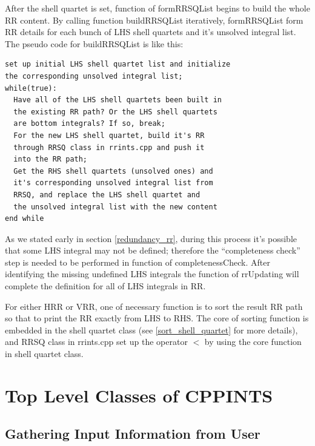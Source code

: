 After the shell quartet is set, function of formRRSQList begins to build 
the whole RR content. By calling function buildRRSQList iteratively, 
formRRSQList form RR details for each bunch of LHS shell quartets and it's 
unsolved integral list. The pseudo code for buildRRSQList is like this:
\begin{verbatim}
set up initial LHS shell quartet list and initialize 
the corresponding unsolved integral list;
while(true):  
  Have all of the LHS shell quartets been built in
  the existing RR path? Or the LHS shell quartets
  are bottom integrals? If so, break;
  For the new LHS shell quartet, build it's RR 
  through RRSQ class in rrints.cpp and push it
  into the RR path;
  Get the RHS shell quartets (unsolved ones) and 
  it's corresponding unsolved integral list from
  RRSQ, and replace the LHS shell quartet and 
  the unsolved integral list with the new content
end while 
\end{verbatim}

As we stated early in section \ref{redundancy_rr}, during 
this process it's possible that some LHS integral may 
not be defined; therefore the ``completeness check''
step is needed to be performed in function of completenessCheck.
After identifying the missing undefined LHS integrals
the function of rrUpdating will complete the definition
for all of LHS integrals in RR.

For either HRR or VRR, one of necessary function is to sort
the result RR path so that to print the RR exactly from 
LHS to RHS. The core of sorting function is embedded in the 
shell quartet class (see \ref{sort_shell_quartet} for more 
details), and RRSQ class in rrints.cpp set up the operator
$<$ by using the core function in shell quartet class.

\section{Top Level Classes of CPPINTS}


\subsection{Gathering Input Information from User}

